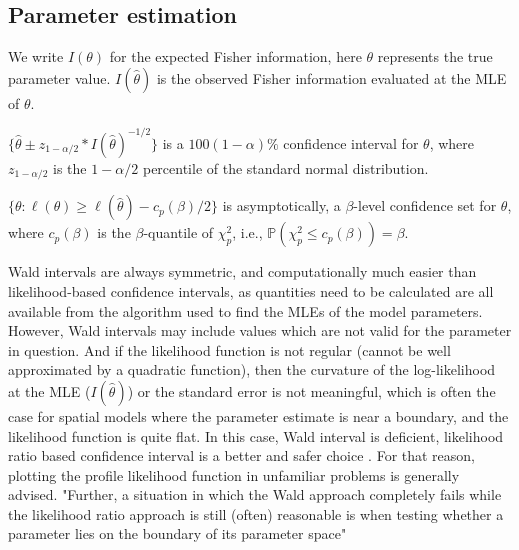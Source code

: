 \documentclass{article}\usepackage[]{graphicx}\usepackage[]{color}
\def\Pr{{\mathbb{P}}}
\begin{document}
\subsection{Parameter estimation}
We write $I(\theta)$ for the expected Fisher information, here $\theta$ represents the true parameter value. $I(\hat{\theta})$ is the observed Fisher information evaluated at the MLE of $\theta$.
\begin{description}[style=unboxed,leftmargin=0cm]
\item[Wald confidence interval] $\{\hat{\theta} \pm z_{1-\alpha/2} * I(\hat{\theta})^{-1/2}\}$ is a $100(1 - \alpha)\%$ confidence interval for $\theta$, where $z_{1-\alpha/2}$ is the $1-\alpha/2$ percentile of the standard normal distribution.

\item[Likelihood-based confidence interval] $\{\theta: \ell(\theta) \geq \ell(\hat{\theta}) - c_p(\beta)/2 \}$ is asymptotically, a $\beta$-level confidence set for $\theta$, where $c_p(\beta)$ is the $\beta$-quantile of $\chi^2_p$, i.e., $\Pr(\chi^2_p \leq c_p(\beta))=\beta$. 
\end{description}
Wald intervals are always symmetric, and computationally much easier than likelihood-based confidence intervals, as quantities need to be calculated are all available from the algorithm used to find the MLEs of the model parameters. However, Wald intervals may include values which are not valid for the parameter in question. And if the likelihood function is not regular (cannot be well approximated by a quadratic function), then the curvature of the log-likelihood at the MLE ($I(\hat{\theta})$) or the standard error is not meaningful, which is often the case for spatial models where the parameter estimate is near a boundary, and the likelihood function is quite flat. In this case, Wald interval is deficient, likelihood ratio based confidence interval is a better and safer choice \cite{pawitan2001all}. For that reason, plotting the profile likelihood function in unfamiliar problems is generally advised.
"Further, a situation in which the Wald approach completely fails while the likelihood ratio approach is still (often) reasonable is when testing whether a parameter lies on the boundary of its parameter space"
\end{document}
